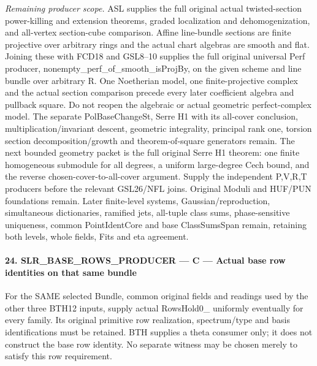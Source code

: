 \emph{Remaining producer scope.} ASL supplies the full original actual twisted-section power-killing and extension theorems, graded localization and dehomogenization, and all-vertex section-cube comparison. Affine line-bundle sections are finite projective over arbitrary rings and the actual chart algebras are smooth and flat. Joining these with FCD18 and GSL8–10 supplies the full original universal Perf producer, nonempty\_\allowbreak perf\_\allowbreak of\_\allowbreak smooth\_\allowbreak isProjBy, on the given scheme and line bundle over arbitrary R. One Noetherian model, one finite-projective complex and the actual section comparison precede every later coefficient algebra and pullback square. Do not reopen the algebraic or actual geometric perfect-complex model. The separate PolBaseChangeSt, Serre H1 with its all-cover conclusion, multiplication/invariant descent, geometric integrality, principal rank one, torsion section decomposition/growth and theorem-of-square generators remain. The next bounded geometry packet is the full original Serre H1 theorem: one finite homogeneous submodule for all degrees, a uniform large-degree Cech bound, and the reverse chosen-cover-to-all-cover argument. Supply the independent P,V,R,T producers before the relevant GSL26/NFL joins. Original Moduli and HUF/PUN foundations remain. Later finite-level systems, Gaussian/reproduction, simultaneous dictionaries, ramified jets, all-tuple class sums, phase-sensitive uniqueness, common PointIdentCore and base ClassSumsSpan remain, retaining both levels, whole fields, Fits and eta agreement.



\paragraph{24. SLR\_\allowbreak BASE\_\allowbreak ROWS\_\allowbreak PRODUCER — C — Actual base row identities on that same bundle}

For the SAME selected Bundle, common original fields and readings used by the other three BTH12 inputs, supply actual RowsHold0\_ uniformly eventually for every family. Its original primitive row realization, spectrum/type and basis identifications must be retained. BTH supplies a theta consumer only; it does not construct the base row identity. No separate witness may be chosen merely to satisfy this row requirement.


